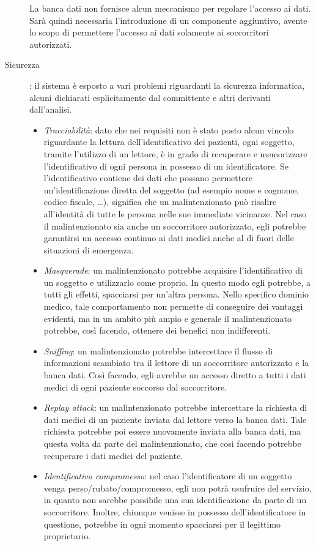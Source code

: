 \documentclass[a4paper,12pt]{report}
\begin{document}
\begin{description}
	La banca dati non fornisce alcun meccanismo per regolare l'accesso ai dati. Sarà quindi necessaria l'introduzione di un componente aggiuntivo, avente lo scopo di permettere l'accesso ai dati solamente ai soccorritori autorizzati.
	
	\item[Sicurezza]: il sistema è esposto a vari problemi riguardanti la sicurezza informatica, alcuni dichiarati esplicitamente dal committente e altri derivanti dall'analisi. 
	\begin{itemize}
		\item \emph{Tracciabilità}: dato che nei requisiti non è stato posto alcun vincolo riguardante la lettura dell'identificativo dei pazienti, ogni soggetto, tramite l'utilizzo di un lettore, è in grado di recuperare e memorizzare l'identificativo di ogni persona in possesso di un identificatore. Se l'identificativo contiene dei dati che possano permettere un'identificazione diretta del soggetto (ad esempio nome e cognome, codice fiscale, \dots), significa che un malintenzionato può risalire all'identità di tutte le persona nelle sue immediate vicinanze. Nel caso il malintenzionato sia anche un soccorritore autorizzato, egli potrebbe garantirsi un accesso continuo ai dati medici anche al di fuori delle situazioni di emergenza.
		\item \emph{Masquerade}: un malintenzionato potrebbe acquisire l'identificativo di un soggetto e utilizzarlo come proprio. In questo modo egli potrebbe, a tutti gli effetti, spacciarsi per un'altra persona. Nello specifico dominio medico, tale comportamento non permette di conseguire dei vantaggi evidenti, ma in un ambito più ampio e generale il malintenzionato potrebbe, così facendo, ottenere dei benefici non indifferenti. 
		\item \emph{Sniffing}: un malintenzionato potrebbe intercettare il flusso di informazioni scambiato tra il lettore di un soccorritore autorizzato e la banca dati. Così facendo, egli avrebbe un accesso diretto a tutti i dati medici di ogni paziente soccorso dal soccorritore.
		\item \emph{Replay attack}: un malintenzionato potrebbe intercettare la richiesta di dati medici di un paziente inviata dal lettore verso la banca dati. Tale richiesta potrebbe poi essere nuovamente inviata alla banca dati, ma questa volta da parte del malintenzionato, che così facendo potrebbe recuperare i dati medici del paziente.
		\item \emph{Identificativo compromesso}: nel caso l'identificatore di un soggetto venga perso/rubato/compromesso, egli non potrà usufruire del servizio, in quanto non sarebbe possibile una sua identificazione da parte di un soccorritore. Inoltre, chiunque venisse in possesso dell'identificatore in questione, potrebbe in ogni momento spacciarsi per il legittimo proprietario.

\end{itemize}
\end{description}
\end{document}
